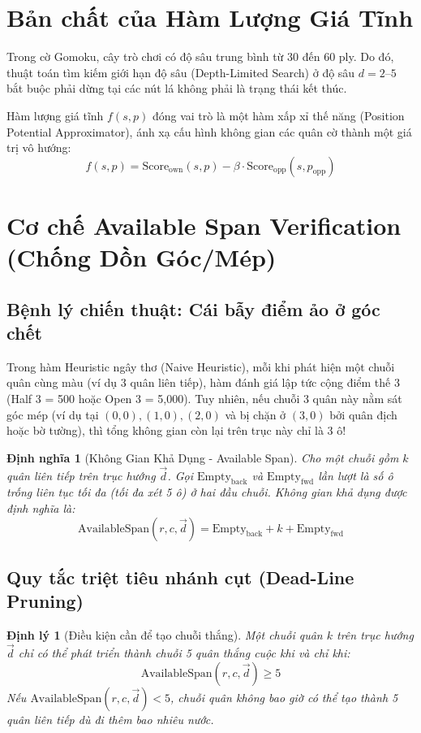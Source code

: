 \documentclass[11pt,a4paper]{report}
\newtheorem{theorem}{Định lý}[chapter]
\newtheorem{definition}{Định nghĩa}[chapter]
\begin{document}
\section{Bản chất của Hàm Lượng Giá Tĩnh}
Trong cờ Gomoku, cây trò chơi có độ sâu trung bình từ 30 đến 60 ply. Do đó, thuật toán tìm kiếm giới hạn độ sâu (Depth-Limited Search) ở độ sâu $d = 2\text{--}5$ bắt buộc phải dừng tại các nút lá không phải là trạng thái kết thúc. 

Hàm lượng giá tĩnh $f(s, p)$ đóng vai trò là một hàm xấp xỉ thế năng (Position Potential Approximator), ánh xạ cấu hình không gian các quân cờ thành một giá trị vô hướng:
\begin{equation}
    f(s, p) = \text{Score}_{\text{own}}(s, p) - \beta \cdot \text{Score}_{\text{opp}}(s, p_{\text{opp}})
\end{equation}

\section{Cơ chế Available Span Verification (Chống Dồn Góc/Mép)}

\subsection{Bệnh lý chiến thuật: Cái bẫy điểm ảo ở góc chết}
Trong hàm Heuristic ngây thơ (Naive Heuristic), mỗi khi phát hiện một chuỗi quân cùng màu (ví dụ 3 quân liên tiếp), hàm đánh giá lập tức cộng điểm thế 3 (Half 3 = 500 hoặc Open 3 = 5,000). Tuy nhiên, nếu chuỗi 3 quân này nằm sát góc mép (ví dụ tại $(0, 0), (1, 0), (2, 0)$ và bị chặn ở $(3, 0)$ bởi quân địch hoặc bờ tường), thì tổng không gian còn lại trên trục này chỉ là 3 ô!

\begin{definition}[Không Gian Khả Dụng - Available Span]
Cho một chuỗi gồm $k$ quân liên tiếp trên trục hướng $\vec{d}$. Gọi $\text{Empty}_{\text{back}}$ và $\text{Empty}_{\text{fwd}}$ lần lượt là số ô trống liên tục tối đa (tối đa xét 5 ô) ở hai đầu chuỗi. Không gian khả dụng được định nghĩa là:
\begin{equation}
    \text{AvailableSpan}(r, c, \vec{d}) = \text{Empty}_{\text{back}} + k + \text{Empty}_{\text{fwd}}
\end{equation}
\end{definition}

\subsection{Quy tắc triệt tiêu nhánh cụt (Dead-Line Pruning)}
\begin{theorem}[Điều kiện cần để tạo chuỗi thắng]
Một chuỗi quân $k$ trên trục hướng $\vec{d}$ chỉ có thể phát triển thành chuỗi 5 quân thắng cuộc khi và chỉ khi:
\begin{equation}
    \text{AvailableSpan}(r, c, \vec{d}) \ge 5
\end{equation}
Nếu $\text{AvailableSpan}(r, c, \vec{d}) < 5$, chuỗi quân không bao giờ có thể tạo thành 5 quân liên tiếp dù đi thêm bao nhiêu nước.
\end{theorem}
\end{document}
